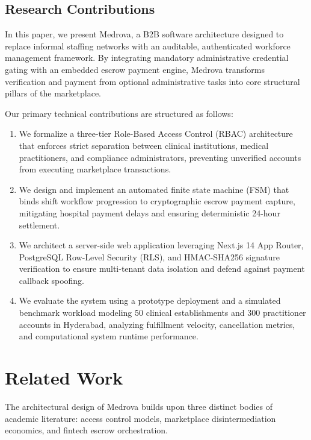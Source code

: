 \documentclass[conference]{IEEEtran}
\begin{document}
\subsection{Research Contributions}
In this paper, we present Medrova, a B2B software architecture designed to replace informal staffing networks with an auditable, authenticated workforce management framework. By integrating mandatory administrative credential gating with an embedded escrow payment engine, Medrova transforms verification and payment from optional administrative tasks into core structural pillars of the marketplace.

Our primary technical contributions are structured as follows:
\begin{enumerate}
    \item We formalize a three-tier Role-Based Access Control (RBAC) architecture that enforces strict separation between clinical institutions, medical practitioners, and compliance administrators, preventing unverified accounts from executing marketplace transactions.
    \item We design and implement an automated finite state machine (FSM) that binds shift workflow progression to cryptographic escrow payment capture, mitigating hospital payment delays and ensuring deterministic 24-hour settlement.
    \item We architect a server-side web application leveraging Next.js 14 App Router, PostgreSQL Row-Level Security (RLS), and HMAC-SHA256 signature verification to ensure multi-tenant data isolation and defend against payment callback spoofing.
    \item We evaluate the system using a prototype deployment and a simulated benchmark workload modeling 50 clinical establishments and 300 practitioner accounts in Hyderabad, analyzing fulfillment velocity, cancellation metrics, and computational system runtime performance.
\end{enumerate}

\section{Related Work}
The architectural design of Medrova builds upon three distinct bodies of academic literature: access control models, marketplace disintermediation economics, and fintech escrow orchestration.
\end{document}
